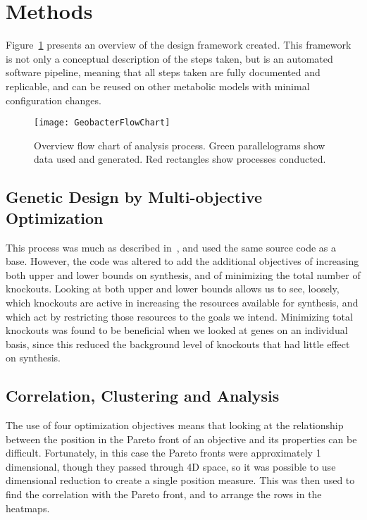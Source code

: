 \documentclass[a4paper,twocolumn]{article}
\begin{document}
\section{Methods}

Figure~\ref{fig:flowdiagram} presents an overview of the design framework created. This framework is not only a conceptual description of the steps taken, but is an automated software pipeline, meaning that all steps taken are fully documented and replicable, and can be reused on other metabolic models with minimal configuration changes. 

\begin{figure}[!htb]
\texttt{[image: GeobacterFlowChart]}
\caption{Overview flow chart of analysis process. Green parallelograms show data used and generated. Red rectangles show processes conducted.}
\label{fig:flowdiagram}
\end{figure}

\subsection{Genetic Design by Multi-objective Optimization}
This process was much as described in~\cite{Costanza2012}, and used the same source code as a base. However, the code was altered to add the additional objectives of increasing both upper and lower bounds on synthesis, and of minimizing the total number of knockouts. Looking at both upper and lower bounds allows us to see, loosely, which knockouts are active in increasing the resources available for synthesis, and which act by restricting those resources to the goals we intend. Minimizing total knockouts was found to be beneficial when we looked at genes on an individual basis, since this reduced the background level of knockouts that had little effect on synthesis.

\subsection{Correlation, Clustering and Analysis}
The use of four optimization objectives means that looking at the relationship between the position in the Pareto front of an objective and its properties can be difficult. Fortunately, in this case the Pareto fronts were approximately 1 dimensional, though they passed through 4D space, so it was possible to use dimensional reduction to create a single position measure. This was then used to find the correlation with the Pareto front, and to arrange the rows in the heatmaps.
\end{document}
